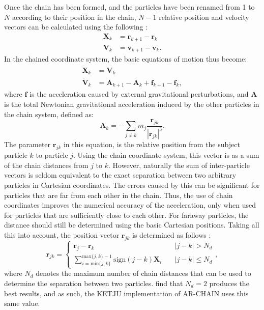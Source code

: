 \documentclass[english, twoside]{HYgradu}
\begin{document}
Once the chain has been formed, and the particles have been renamed from 1 to $N$ according to their position in the chain, $N - 1$ relative position and velocity vectors can be calculated using the following \citep{Mikkola2008ARCHAIN}:
\begin{equation}
\begin{split}
\mathbf{X}_k &= \mathbf{r}_{k+1} - \mathbf{r}_k \\
\mathbf{V}_k &= \mathbf{v}_{k+1} - \mathbf{v}_k.
\end{split}
\end{equation}
In the chained coordinate system, the basic equations of motion thus become:
\begin{equation}
\begin{split}
\dot{\mathbf{X}}_k &= \mathbf{V}_k \\
\dot{\mathbf{V}}_k &= \mathbf{A}_{k+1} - \mathbf{A}_{k} + \mathbf{f}_{k+1} - \mathbf{f}_{k},
\end{split}
\end{equation}
where $\mathbf{f}$ is the acceleration caused by external gravitational perturbations, and $\mathbf{A}$ is the total Newtonian gravitational acceleration induced by the other particles in the chain system, defined as:
\begin{equation}
\mathbf{A}_k = - \displaystyle\sum_{j \neq k} m_j \frac{\mathbf{r}_{jk}}{|\mathbf{r}_{jk}|^3}.
\end{equation}
The parameter $\mathbf{r}_{jk}$ in this equation, is the relative position from the subject particle $k$ to particle $j$. Using the chain coordinate system, this vector is as a sum of the chain distances from $j$ to $k$. However, naturally the sum of inter-particle vectors is seldom equivalent to the exact separation between two arbitrary particles in Cartesian coordinates. The errors caused by this can be significant for particles that are far from each other in the chain. Thus, the use of chain coordinates improves the numerical accuracy of the acceleration, only when used for particles that are sufficiently close to each other. For faraway particles, the distance should still be determined using the basic Cartesian positions. Taking all this into account, the position vector $\mathbf{r}_{jk}$ is determined as follows \citep[e.g.][]{Rantala2017KETJU}:
\begin{equation}
\mathbf{r}_{jk} = 
	\begin{cases}
		\mathbf{r}_j - \mathbf{r}_k &\quad |j-k| > N_d \\
		\displaystyle\sum^{\mathrm{max} \{ j,k \}-1}_{i = \mathrm{min} \{ j,k \}} \mathrm{sign}(j-k) \mathbf{X}_i &\quad |j-k| \leq N_d
	\end{cases}, \label{eq:relative_dist}
\end{equation}
where $N_d$ denotes the maximum number of chain distances that can be used to determine the separation between two particles. \cite{Mikkola2008ARCHAIN} find that $N_d = 2$ produces the best results, and as such, the KETJU implementation of AR-CHAIN uses this same value.
\end{document}
